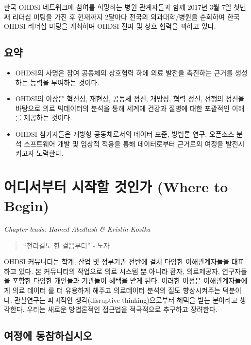 \documentclass[11pt]{book}
\theoremstyle{definition}
\theoremstyle{definition}
\theoremstyle{definition}
\theoremstyle{remark}
\let\BeginKnitrBlock\begin \let\EndKnitrBlock\end
\begin{document}
한국 OHDSI 네트워크에 참여를 희망하는 병원 관계자들과 함께 2017년 3월
7일 첫번째 리더십 미팅을 가진 후 현재까지 2달마다 전국의 의과대학/병원을
순회하며 한국 OHDSI 리더십 미팅을 개최하며 OHDSI 전파 및 상호 협력을
꾀하고 있다.

\section{요약}

\BeginKnitrBlock{rmdsummary}
\begin{itemize}
\item
  OHDSI의 사명은 참여 공동체의 상호협력 하에 의료 발전을 촉진하는 근거를
  생성하는 능력을 부여하는 것이다.
\item
  OHDSI의 이상은 혁신성, 재현성, 공동체 정신, 개방성, 협력 정신, 선행의
  정신을 바탕으로 의료 빅데이터의 분석을 통해 세계에 건강과 질병에 대한
  포괄적인 이해를 제공하는 것이다.
\item
  OHDSI 참가자들은 개방형 공동체로서의 데이터 표준, 방법론 연구,
  오픈소스 분석 소프트웨어 개발 및 임상적 적용을 통해 데이터로부터
  근거로의 여정을 발전시키고자 노력한다.
\end{itemize}
\EndKnitrBlock{rmdsummary}

\chapter{어디서부터 시작할 것인가 (Where to Begin)}\label{WhereToBegin}

\emph{Chapter leads: Hamed Abedtash \& Kristin Kostka}

\begin{quote}
``천리길도 한 걸음부터'' - 노자
\end{quote}

OHDSI 커뮤니티는 학계, 산업 및 정부기관 전반에 걸쳐 다양한
이해관계자들을 대표하고 있다. 본 커뮤니티의 작업으로 의료 시스템 뿐
아니라 환자, 의료제공자, 연구자들을 포함한 다양한 개인들과 기관들이
혜택을 받게 된다. 이러한 이점은 이해관계자들에게 의료 데이터 를 더
유용하게 해주고 의료데이터 분석의 질도 향상시켜주는 덕분이다. 관찰연구는
파괴적인 생각(disruptive thinking)으로부터 혜택을 받는 분야라고
생각한다. 우리는 새로운 방법론적인 접근법을 적극적으로 추구하고
장려한다. 

\section{여정에 동참하십시오}\label{-}
\end{document}
